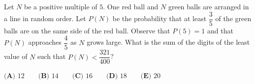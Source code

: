 Let $N$ be a positive multiple of $5$. One red ball and $N$ green balls are arranged in a line in random order. Let $P(N)$ be the probability that at least $\dfrac35$ of the green balls are on the same side of the red ball. Observe that $P(5)=1$ and that $P(N)$ approaches $\dfrac45$ as $N$ grows large. What is the sum of the digits of the least value of $N$ such that $P(N)<\dfrac{321}{400}$?

$\textbf{(A) }12\qquad\textbf{(B) }14\qquad\textbf{(C) }16\qquad\textbf{(D) }18\qquad\textbf{(E) }20$
